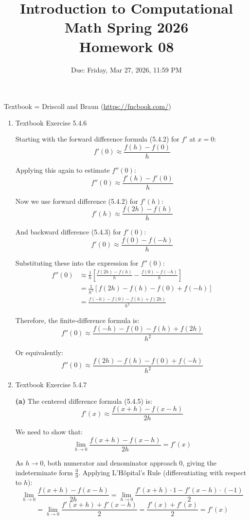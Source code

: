 \documentclass[reqno]{exam}
\title{Introduction to Computational Math Spring 2026 \\ Homework 08}
\date{Due: Friday, Mar 27, 2026, 11:59 PM}
\author{}
\begin{document}
\maketitle
\thispagestyle{empty}

Textbook = Driscoll and Braun (\url{https://fncbook.com/})

\begin{enumerate}

\item Textbook Exercise 5.4.6

\begin{solution}
Starting with the forward difference formula (5.4.2) for $f'$ at $x = 0$:
$$f'(0) \approx \frac{f(h) - f(0)}{h}$$

Applying this again to estimate $f''(0)$:
$$f''(0) \approx \frac{f'(h) - f'(0)}{h}$$

Now we use forward difference (5.4.2) for $f'(h)$:
$$f'(h) \approx \frac{f(2h) - f(h)}{h}$$

And backward difference (5.4.3) for $f'(0)$:
$$f'(0) \approx \frac{f(0) - f(-h)}{h}$$

Substituting these into the expression for $f''(0)$:
\begin{align*}
f''(0) &\approx \frac{1}{h}\left[\frac{f(2h) - f(h)}{h} - \frac{f(0) - f(-h)}{h}\right]\\
&= \frac{1}{h^2}\left[f(2h) - f(h) - f(0) + f(-h)\right]\\
&= \frac{f(-h) - f(0) - f(h) + f(2h)}{h^2}
\end{align*}

Therefore, the finite-difference formula is:
$$\boxed{f''(0) \approx \frac{f(-h) - f(0) - f(h) + f(2h)}{h^2}}$$

Or equivalently:
$$\boxed{f''(0) \approx \frac{f(2h) - f(h) - f(0) + f(-h)}{h^2}}$$
\end{solution}

\item Textbook Exercise 5.4.7
\begin{solution}
\textbf{(a)} The centered difference formula (5.4.5) is:
$$f'(x) \approx \frac{f(x+h) - f(x-h)}{2h}$$

We need to show that:
$$\lim_{h \to 0} \frac{f(x+h) - f(x-h)}{2h} = f'(x)$$

As $h \to 0$, both numerator and denominator approach 0, giving the indeterminate form $\frac{0}{0}$. Applying L'Hôpital's Rule (differentiating with respect to $h$):
$$\lim_{h \to 0} \frac{f(x+h) - f(x-h)}{2h} = \lim_{h \to 0} \frac{f'(x+h) \cdot 1 - f'(x-h) \cdot (-1)}{2}$$
$$= \lim_{h \to 0} \frac{f'(x+h) + f'(x-h)}{2} = \frac{f'(x) + f'(x)}{2} = f'(x)$$


\end{solution}
\end{enumerate}
\end{document}
